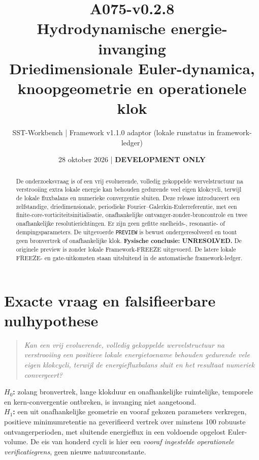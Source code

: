 \documentclass[10pt,a4paper]{article}
\title{\textcolor{main}{A075-v0.2.8}\\Hydrodynamische energie-invanging\\\large Driedimensionale Euler-dynamica, knoopgeometrie en operationele klok}
\author{SST-Workbench | Framework v1.1.0 adaptor (lokale runstatus in framework-ledger)}
\date{28 oktober 2026 | \textbf{DEVELOPMENT ONLY}}
\begin{document}
\maketitle
\begin{abstract}
De onderzoeksvraag is of een vrij evoluerende, volledig gekoppelde wervelstructuur na verstrooiing extra lokale energie kan behouden gedurende veel eigen klokcycli, terwijl de lokale fluxbalans en numerieke convergentie sluiten. Deze release introduceert een zelfstandige, driedimensionale, periodieke Fourier--Galerkin-Eulerreferentie, met een finite-core-vorticiteitsinitialisatie, onafhankelijke ontvanger-zonder-broncontrole en twee onafhankelijke resolutierichtingen. Er zijn geen gefitte snelheids-, resonantie- of dempingsparameters. De uitgevoerde \texttt{PREVIEW} is bewust ondergeresolveerd en toont geen bronvertrek of onafhankelijke klok. \textbf{Fysische conclusie: UNRESOLVED.} De originele preview is zonder lokale Framework-FREEZE uitgevoerd. De latere lokale FREEZE- en gate-uitkomsten staan uitsluitend in de automatische framework-ledger.
\end{abstract}
\section{Exacte vraag en falsifieerbare nulhypothese}
\begin{quote}\emph{Kan een vrij evoluerende, volledig gekoppelde wervelstructuur na verstrooiing een positieve lokale energietoename behouden gedurende vele eigen klokcycli, terwijl de energiefluxbalans sluit en het resultaat numeriek convergeert?}\end{quote}
\textbf{$H_0$:} zolang bronvertrek, lange klokduur en onafhankelijke ruimtelijke, temporele en kern-convergentie ontbreken, is invanging niet aangetoond.\\
\textbf{$H_1$:} een uit onafhankelijke geometrie en vooraf gekozen parameters verkregen, positieve minimumretentie na geverifieerd vertrek over minstens 100 robuuste ontvangerperioden, met sluitende energieflux in een voldoende opgelost Euler-volume.
De eis van honderd cycli is hier een \emph{vooraf ingestelde operationele verificatiegrens}, geen nieuwe natuurconstante.
\end{document}
